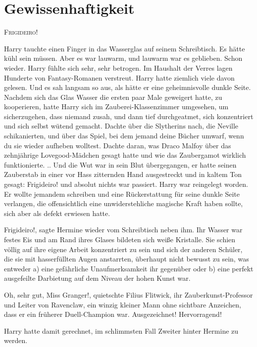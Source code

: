 \chapter{Gewissenhaftigkeit}

\lettrine{\loq F}{rigideiro}!\grqq{}

Harry tauchte einen Finger in das Wasserglas auf seinem Schreibtisch. Es hätte
kühl sein müssen. Aber es war lauwarm, und lauwarm war es geblieben. Schon
wieder. Harry fühlte sich sehr, sehr betrogen. Im Haushalt der Verres lagen
Hunderte von Fantasy-Romanen verstreut. Harry hatte ziemlich viele davon
gelesen. Und es sah langsam so aus, als hätte er eine geheimnisvolle dunkle
Seite. Nachdem sich das Glas Wasser die ersten paar Male geweigert hatte, zu
kooperieren, hatte Harry sich im Zauberei-Klassenzimmer umgesehen, um
sicherzugehen, dass niemand zusah, und dann tief durchgeatmet, sich konzentriert
und sich selbst wütend gemacht. Dachte über die Slytherins nach, die Neville
schikanierten, und über das Spiel, bei dem jemand deine Bücher umwarf, wenn du
sie wieder aufheben wolltest. Dachte daran, was Draco Malfoy über das
zehnjährige Lovegood-Mädchen gesagt hatte und wie das Zaubergamot wirklich
funktionierte. .. Und die Wut war in sein Blut übergegangen, er hatte seinen
Zauberstab in einer vor Hass zitternden Hand ausgestreckt und in kaltem Ton
gesagt: \glqq{}Frigideiro!\grqq{} und absolut nichts war passiert. Harry war
reingelegt worden. Er wollte jemandem schreiben und eine Rückerstattung für
seine dunkle Seite verlangen, die offensichtlich eine unwiderstehliche magische
Kraft haben sollte, sich aber als defekt erwiesen hatte.

\glqq{}Frigideiro!\grqq{}, sagte Hermine wieder vom Schreibtisch neben ihm. Ihr
Wasser war festes Eis und am Rand ihres Glases bildeten sich weiße Kristalle.
Sie schien völlig auf ihre eigene Arbeit konzentriert zu sein und sich der
anderen Schüler, die sie mit hasserfüllten Augen anstarrten, überhaupt nicht
bewusst zu sein, was entweder a) eine gefährliche Unaufmerksamkeit ihr gegenüber
oder b) eine perfekt ausgefeilte Darbietung auf dem Niveau der hohen Kunst war.

\glqq{}Oh, sehr gut, Miss Granger!\grqq{}, quietschte Filius Flitwick, ihr
Zauberkunst-Professor und Leiter von Ravenclaw, ein winzig kleiner Mann ohne
sichtbare Anzeichen, dass er ein früherer Duell-Champion war. \glqq{}
Ausgezeichnet! Hervorragend!\grqq{}

Harry hatte damit gerechnet, im schlimmsten Fall Zweiter hinter Hermine zu
werden.

